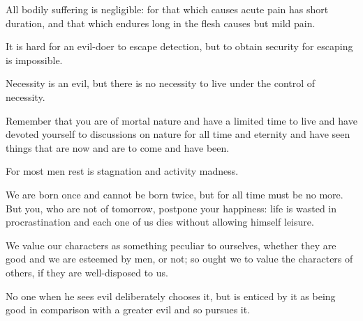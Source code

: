 \documentclass{stex}
\begin{document}


\begin{sparagraph}[title=4]
  All bodily suffering is negligible: for that which causes acute pain has short duration, and that which endures long in the flesh causes but mild pain.
\end{sparagraph}
\vspace{0.5em}
\begin{sparagraph}[title=7]
  It is hard for an evil-doer to escape detection, but to obtain security for escaping is impossible.
\end{sparagraph}
\vspace{0.5em}
\begin{sparagraph}[title=9]
  Necessity is an evil, but there is no necessity to live under the control of necessity.
\end{sparagraph}
\vspace{0.5em}
\begin{sparagraph}[title=10]
  Remember that you are of mortal nature and have a limited time to live and have devoted yourself to discussions on nature for all time and eternity and have seen things that are now and are to come and have been.
\end{sparagraph}
\vspace{0.5em}
\begin{sparagraph}[title=11]
  For most men rest is stagnation and activity madness.
\end{sparagraph}
\vspace{0.5em}
\begin{sparagraph}[title=14]
  We are born once and cannot be born twice, but for all time must be no more.
  But you, who are not  of tomorrow, postpone your happiness: life is wasted in procrastination and each one of us dies without allowing himself leisure.
\end{sparagraph}
\vspace{0.5em}
\begin{sparagraph}[title=15]
  We value our characters as something peculiar to ourselves, whether they are good and we are esteemed by men, or not; so ought we to value the characters of others, if they are well-disposed to us.
\end{sparagraph}
\vspace{0.5em}
\begin{sparagraph}[title=16]
  No one when he sees evil deliberately chooses it, but is enticed by it as being good in comparison with a greater evil and so pursues it.
\end{sparagraph}
\end{document}
